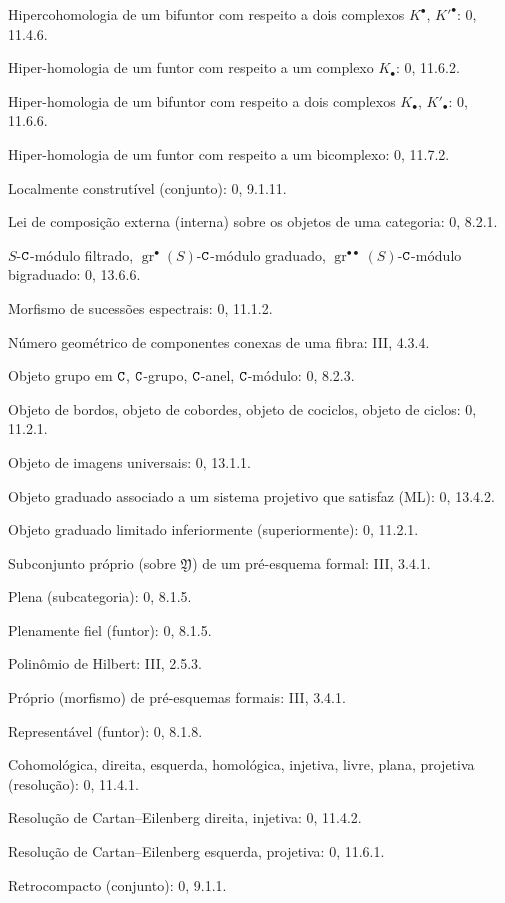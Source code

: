 \begin{flushleft}
Hipercohomologia de um bifuntor com respeito a dois complexos
$K^\bullet$, $K'^{\bullet}$: 0, 11.4.6.

Hiper-homologia de um funtor com respeito a um complexo $K_\bullet$:
0, 11.6.2.

Hiper-homologia de um bifuntor com respeito a dois complexos $K_\bullet$,
$K'_\bullet$: 0, 11.6.6.

Hiper-homologia de um funtor com respeito a um bicomplexo: 0, 11.7.2.

Localmente construtível (conjunto): 0, 9.1.11.

Lei de composição externa (interna) sobre os objetos de uma categoria: 0, 8.2.1.


$S$-$\mathtt{C}$-módulo filtrado, $\operatorname{gr}^\bullet(S)$-$\mathtt{C}$-módulo graduado,
$\operatorname{gr}^{\bullet\bullet}(S)$-$\mathtt{C}$-módulo bigraduado: 0, 13.6.6.

Morfismo de sucessões espectrais: 0, 11.1.2.

Número geométrico de componentes conexas de uma fibra: III, 4.3.4.

Objeto grupo em $\mathtt{C}$, $\mathtt{C}$-grupo, $\mathtt{C}$-anel, $\mathtt{C}$-módulo: 0, 8.2.3.

Objeto de bordos, objeto de cobordes, objeto de cociclos, objeto de
ciclos: 0, 11.2.1.

Objeto de imagens universais: 0, 13.1.1.

Objeto graduado associado a um sistema projetivo que satisfaz (ML): 0, 13.4.2.

Objeto graduado limitado inferiormente (superiormente): 0, 11.2.1.

Subconjunto próprio (sobre $\mathfrak Y$) de um pré-esquema formal: III, 3.4.1.

Plena (subcategoria): 0, 8.1.5.

Plenamente fiel (funtor): 0, 8.1.5.

Polinômio de Hilbert: III, 2.5.3.

Próprio (morfismo) de pré-esquemas formais: III, 3.4.1.

Representável (funtor): 0, 8.1.8.

Cohomológica, direita, esquerda, homológica, injetiva, livre, plana, projetiva
(resolução): 0, 11.4.1.

Resolução de Cartan--Eilenberg direita, injetiva: 0, 11.4.2.

Resolução de Cartan--Eilenberg esquerda, projetiva: 0, 11.6.1.

Retrocompacto (conjunto): 0, 9.1.1.


\end{flushleft}
